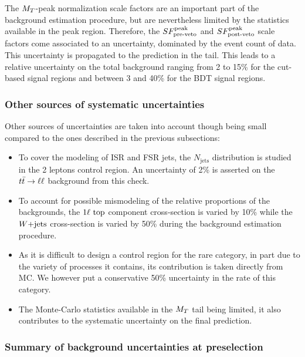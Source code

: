     The $M_T$-peak normalization scale factors are an important part of the background
    estimation procedure, but are nevertheless limited by the statistics available
    in the peak region. Therefore, the $SF_{\text{pre-veto}}^{\text{peak}}$ and $SF_{\text{post-veto}}^{\text{peak}}$ scale factors come
    associated to an uncertainty, dominated by the event count of data. This
    uncertainty is propagated to the prediction in the tail. This leads to a
    relative uncertainty on the total background ranging from 2 to 15\% for the
    cut-based signal regions and between 3 and 40\% for the BDT signal regions.

    \subsubsection{Other sources of systematic uncertainties}

    Other sources of uncertainties are taken into account though being small compared
    to the ones described in the previous subsections:
    \begin{itemize}
        \item To cover the modeling of ISR and FSR jets, the $N_\text{jets}$
              distribution is studied in the 2 leptons control region. An
              uncertainty of 2\% is asserted on the $t\bar{t} \rightarrow \ell \ell$ background
              from this check.
        \item To account for possible mismodeling of the relative proportions of
              the backgrounds, the $1\ell~\text{top}$ component cross-section
              is varied by 10\% while the $\text{$W$+jets}$ cross-section is varied by 50\%
              during the background estimation procedure.
        \item As it is difficult to design a control region for the rare category,
              in part due to the variety of processes it contains, its contribution
              is taken directly from MC. We however put a conservative 50\% uncertainty
              in the rate of this category.
        \item The Monte-Carlo statistics available in the $M_T$ tail being limited,
              it also contributes to the systematic uncertainty on the final prediction.
    \end{itemize}

    \subsubsection{Summary of background uncertainties at preselection}


